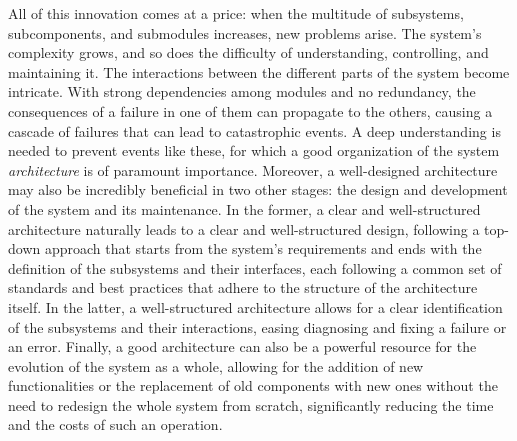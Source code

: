 All of this innovation comes at a price: when the multitude of subsystems, subcomponents, and submodules increases, new problems arise. The system's complexity grows, and so does the difficulty of understanding, controlling, and maintaining it. The interactions between the different parts of the system become intricate. With strong dependencies among modules and no redundancy, the consequences of a failure in one of them can propagate to the others, causing a cascade of failures that can lead to catastrophic events. A deep understanding is needed to prevent events like these, for which a good organization of the system \emph{architecture} is of paramount importance. Moreover, a well-designed architecture may also be incredibly beneficial in two other stages: the design and development of the system and its maintenance. In the former, a clear and well-structured architecture naturally leads to a clear and well-structured design, following a top-down approach that starts from the system's requirements and ends with the definition of the subsystems and their interfaces, each following a common set of standards and best practices that adhere to the structure of the architecture itself. In the latter, a well-structured architecture allows for a clear identification of the subsystems and their interactions, easing diagnosing and fixing a failure or an error. Finally, a good architecture can also be a powerful resource for the evolution of the system as a whole, allowing for the addition of new functionalities or the replacement of old components with new ones without the need to redesign the whole system from scratch, significantly reducing the time and the costs of such an operation.

